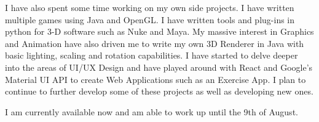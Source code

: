 \documentclass[11pt, a4paper]{awesome-cv}
\begin{document}
\begin{cvletter}
I have also spent some time working on my own side projects. I have written multiple games using Java and OpenGL. I have written tools and plug-ins in python for 3-D software such as Nuke and Maya. My massive interest in Graphics and Animation have also driven me to write my own 3D Renderer in Java with basic lighting, scaling and rotation capabilities. I have started to delve deeper into the areas of UI/UX Design and have played around with React and Google’s Material UI API to create Web Applications such as an Exercise App. I plan to continue to further develop some of these projects as well as developing new ones. 

I am currently available now and am able to work up until the 9th of August.
\end{cvletter}


\makeletterclosing
\end{document}
